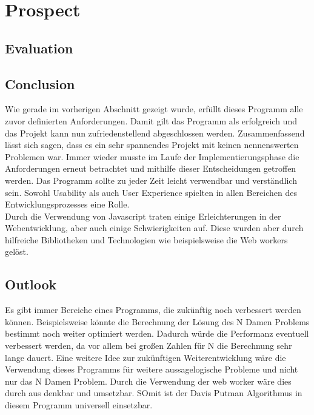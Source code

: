 
\chapter{Prospect}
\section{Evaluation}
\section{Conclusion}
Wie gerade im vorherigen Abschnitt gezeigt wurde, erfüllt dieses Programm alle zuvor definierten Anforderungen. Damit gilt das Programm als erfolgreich und das Projekt kann nun zufriedenstellend abgeschlossen werden. Zusammenfassend lässt sich sagen, dass es ein sehr spannendes Projekt mit keinen nennenswerten Problemen war. Immer wieder musste im Laufe der Implementierungsphase die Anforderungen erneut betrachtet und mithilfe dieser Entscheidungen getroffen werden. Das Programm sollte zu jeder Zeit leicht verwendbar und verständlich sein. Sowohl Usability als auch User Experience spielten in allen Bereichen des Entwicklungsprozesses eine Rolle. 
\\
Durch die Verwendung von Javascript traten einige Erleichterungen in der Webentwicklung, aber auch einige Schwierigkeiten auf. Diese wurden aber durch hilfreiche Bibliotheken und Technologien wie beispielsweise die Web workers gelöst. 
\section{Outlook} 
Es gibt immer Bereiche eines Programms, die zukünftig noch verbessert werden können. Beispielsweise könnte die Berechnung der Lösung des N Damen Problems bestimmt noch weiter optimiert werden. Dadurch würde die Performanz eventuell verbessert werden, da vor allem bei großen Zahlen für N die Berechnung sehr lange dauert. 
Eine weitere Idee zur zukünftigen Weiterentwicklung wäre die Verwendung dieses Programms für weitere aussagelogische Probleme und nicht nur das N Damen Problem. Durch die Verwendung der web worker wäre dies durch aus denkbar und umsetzbar. SOmit ist der Davis Putman Algorithmus in diesem Programm universell einsetzbar.